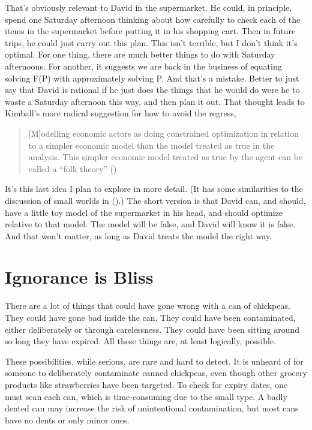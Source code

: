 \documentclass[
  10pt,
  letterpaper,
  twoside]{scrbook}
\begin{document}
That's obviously relevant to David in the supermarket. He could, in
principle, spend one Saturday afternoon thinking about how carefully to
check each of the items in the supermarket before putting it in his
shopping cart. Then in future trips, he could just carry out this plan.
This isn't terrible, but I don't think it's optimal. For one thing,
there are much better things to do with Saturday afternoons. For
another, it suggests we are back in the business of equating solving
F(P) with approximately solving P. And that's a mistake. Better to just
say that David is rational if he just does the things that he would do
were he to waste a Saturday afternoon this way, and then plan it out.
That thought leads to Kimball's more radical suggestion for how to avoid
the regress,

\begin{quote}
{[}M{]}odelling economic actors as doing constrained optimization in
relation to a simpler economic model than the model treated as true in
the analysis. This simpler economic model treated as true by the agent
can be called a ``folk theory'' ()
\end{quote}

It's this last idea I plan to explore in more detail. (It has some
similarities to the discussion of small worlds in
().) The short
version is that David can, and should, have a little toy model of the
supermarket in his head, and should optimize relative to that model. The
model will be false, and David will know it is false. And that won't
matter, as long as David treats the model the right way.

\section{Ignorance is Bliss}\label{sec-ignorancebliss}

There are a lot of things that could have gone wrong with a can of
chickpeas. They could have gone bad inside the can. They could have been
contaminated, either deliberately or through carelessness. They could
have been sitting around so long they have expired. All these things
are, at least logically, possible.

These possibilities, while serious, are rare and hard to detect. It is
unheard of for someone to deliberately contaminate canned chickpeas,
even though other grocery products like strawberries have been targeted.
To check for expiry dates, one must scan each can, which is
time-consuming due to the small type. A badly dented can may increase
the risk of unintentional contamination, but most cans have no dents or
only minor ones.
\end{document}
